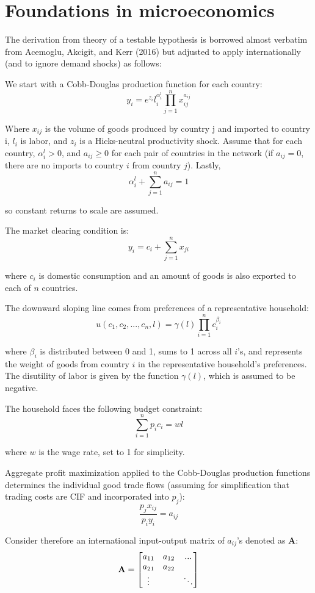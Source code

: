 \documentclass[10pt,letterpaper]{article}
\begin{document}
\section{Foundations in microeconomics}

The derivation from theory of a testable hypothesis is borrowed almost verbatim from Acemoglu, Akcigit, and Kerr (2016) but adjusted to apply internationally (and to ignore demand shocks) as follows:

We start with a Cobb-Douglas production function for each country:
$$ y_i = e^{z_i}l_i^{\alpha_i^l} \prod_{j=1}^{n} x_{ij}^{a_{ij}}$$

Where $x_{ij}$ is the volume of goods produced by country j and imported to country i, $l_i$ is labor, and $z_i$ is a Hicks-neutral productivity shock. Assume that for each country, $\alpha_i^l >0$, and $a_{ij} \geq 0$ for each pair of countries in the network (if $a_{ij} = 0$, there are no imports to country $i$ from country $j$). Lastly,
$$ \alpha_i^l + \sum_{j=1}^{n} a_{ij} = 1$$

so constant returns to scale are assumed. 

The market clearing condition is:
$$y_i = c_i + \sum_{j=1}^{n} x_{ji}$$

where $c_i$ is domestic consumption and an amount of goods is also exported to each of $n$ countries.

The downward sloping line comes from preferences of a representative household:
$$ u(c_1,c_2,...,c_n,l) = \gamma (l) \prod_{i=1}^{n} c_i^{\beta_i}$$

where $\beta_i$ is distributed between 0 and 1, sums to 1 across all $i$'s, and represents the weight of goods from country $i$ in the representative household's preferences. The disutility of labor is given by the function $\gamma (l)$, which is assumed to be negative.

The household faces the following budget constraint:
$$ \sum_{i=1}^{n} p_ic_i = wl$$

where $w$ is the wage rate, set to 1 for simplicity.

Aggregate profit maximization applied to the Cobb-Douglas production functions determines the individual good trade flows (assuming for simplification that trading costs are CIF and incorporated into $p_j$):
$$ \frac{p_jx_{ij}}{p_iy_i} = a_{ij}$$

Consider therefore an international input-output matrix of $a_{ij}$'s denoted as \textbf{A}:
\begin{equation*}
\text{\textbf{A}} = \begin{bmatrix}
		a_{11} & a_{12} & ... \\
		a_{21} & a_{22} &  \\
		\vdots &  & \ddots 
		\end{bmatrix}
\end{equation*}		
\end{document}

